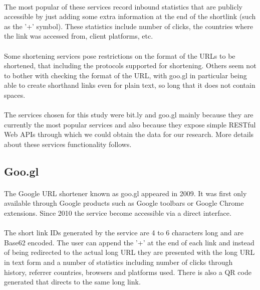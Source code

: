\documentclass[12pt]{article}
\begin{document}
\paragraph{}
The most popular of these services record inbound statistics that are publicly accessible by just adding some extra information at the end of the shortlink (such as the '+' symbol). These statistics include number of clicks, the countries where the link was accessed from, client platforms, etc.

\paragraph{}
Some shortening services pose restrictions on the format of the URLs to be shortened, that including the protocols supported for shortening. Others seem not to bother with checking the format of the URL, with goo.gl in particular being able to create shorthand links even for plain text, so long that it does not contain spaces. 

\paragraph{} 
The services chosen for this study were bit.ly and goo.gl mainly because they are currently the most popular services and also because they expose simple RESTful Web APIs through which we could obtain the data for our research. More details about these services functionality follows. 

\subsection{Goo.gl}

\paragraph{}
The Google URL shortener known as goo.gl appeared in 2009. It was first only available through Google products such as Google toolbars or Google Chrome extensions. Since 2010 the service become accessible via a direct interface. 

\paragraph{}
The short link IDs generated by the service are 4 to 6 characters long and are Base62 encoded. The user can append the '+' at the end of each link and instead of being redirected to the actual long URL they are presented with the long URL in text form and a number of statistics including number of clicks through history, referrer countries, browsers and platforms used. There is also a QR code generated that directs to the same long link. 
\end{document}
